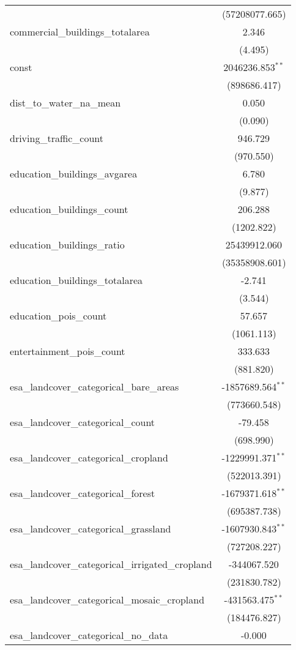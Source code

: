 \begin{table}[!htbp]
\begin{tabular}{@{\extracolsep{5pt}}lc}
  & (57208077.665) \\
 commercial_buildings_totalarea & 2.346$^{}$ \\
  & (4.495) \\
 const & 2046236.853$^{**}$ \\
  & (898686.417) \\
 dist_to_water_na_mean & 0.050$^{}$ \\
  & (0.090) \\
 driving_traffic_count & 946.729$^{}$ \\
  & (970.550) \\
 education_buildings_avgarea & 6.780$^{}$ \\
  & (9.877) \\
 education_buildings_count & 206.288$^{}$ \\
  & (1202.822) \\
 education_buildings_ratio & 25439912.060$^{}$ \\
  & (35358908.601) \\
 education_buildings_totalarea & -2.741$^{}$ \\
  & (3.544) \\
 education_pois_count & 57.657$^{}$ \\
  & (1061.113) \\
 entertainment_pois_count & 333.633$^{}$ \\
  & (881.820) \\
 esa_landcover_categorical_bare_areas & -1857689.564$^{**}$ \\
  & (773660.548) \\
 esa_landcover_categorical_count & -79.458$^{}$ \\
  & (698.990) \\
 esa_landcover_categorical_cropland & -1229991.371$^{**}$ \\
  & (522013.391) \\
 esa_landcover_categorical_forest & -1679371.618$^{**}$ \\
  & (695387.738) \\
 esa_landcover_categorical_grassland & -1607930.843$^{**}$ \\
  & (727208.227) \\
 esa_landcover_categorical_irrigated_cropland & -344067.520$^{}$ \\
  & (231830.782) \\
 esa_landcover_categorical_mosaic_cropland & -431563.475$^{**}$ \\
  & (184476.827) \\
 esa_landcover_categorical_no_data & -0.000$^{}$ \\

\end{tabular}
\end{table}
